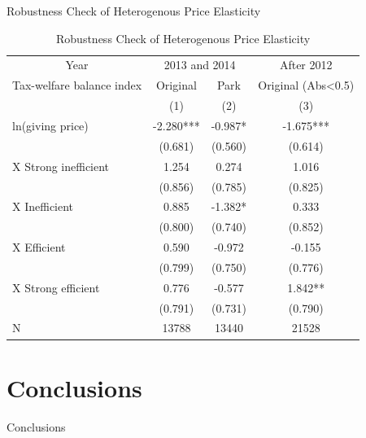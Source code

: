 \documentclass[
  ignorenonframetext,
]{beamer}
\begin{document}
\begin{frame}{Robustness Check of Heterogenous Price Elasticity}
\protect\hypertarget{robustness-check-of-heterogenous-price-elasticity-1}{}
\begin{table}

\caption{\label{tab:kableRobust1EstimateInteractionByBalanceGroup}Robustness Check of Heterogenous Price Elasticity}
\centering
\fontsize{8}{10}\selectfont
\begin{tabular}[t]{lccc}
\toprule
\multicolumn{1}{c}{Year} & \multicolumn{2}{c}{2013 and 2014} & \multicolumn{1}{c}{After 2012} \\
\cmidrule(l{3pt}r{3pt}){1-1} \cmidrule(l{3pt}r{3pt}){2-3} \cmidrule(l{3pt}r{3pt}){4-4}
\multicolumn{1}{c}{Tax-welfare balance index} & \multicolumn{1}{c}{Original} & \multicolumn{1}{c}{Park} & \multicolumn{1}{c}{Original (Abs<0.5)} \\
\cmidrule(l{3pt}r{3pt}){1-1} \cmidrule(l{3pt}r{3pt}){2-2} \cmidrule(l{3pt}r{3pt}){3-3} \cmidrule(l{3pt}r{3pt}){4-4}
 & (1) & (2) & (3)\\
\midrule
ln(giving price) & -2.280*** & -0.987* & -1.675***\\
 & (0.681) & (0.560) & (0.614)\\
\hspace{1em}X Strong inefficient & 1.254 & 0.274 & 1.016\\
\hspace{1em} & (0.856) & (0.785) & (0.825)\\
\hspace{1em}X Inefficient & 0.885 & -1.382* & 0.333\\
\hspace{1em} & (0.800) & (0.740) & (0.852)\\
\hspace{1em}X Efficient & 0.590 & -0.972 & -0.155\\
\hspace{1em} & (0.799) & (0.750) & (0.776)\\
\hspace{1em}X Strong efficient & 0.776 & -0.577 & 1.842**\\
\hspace{1em} & (0.791) & (0.731) & (0.790)\\
N & 13788 & 13440 & 21528\\
\bottomrule
\end{tabular}
\end{table}
\end{frame}

\hypertarget{conclusions}{%
\section{Conclusions}\label{conclusions}}

\begin{frame}{Conclusions}
\protect\hypertarget{conclusions-1}{}
\end{frame}
\end{document}
